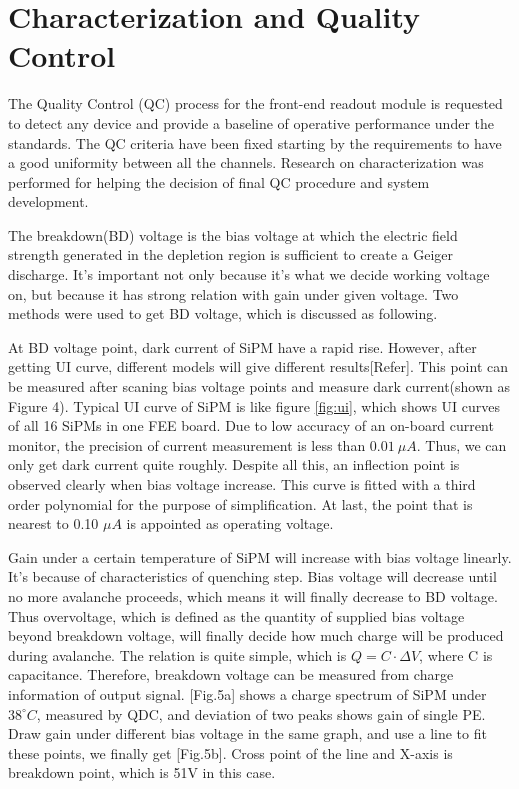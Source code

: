 \documentclass[11pt,a4paper]{article}
\begin{document}
\section{Characterization and Quality Control}
The Quality Control (QC) process for the front-end readout module is requested to detect any device and provide a baseline of operative performance under the standards. The QC criteria have been fixed starting by the requirements to have a good uniformity between all the channels. Research on characterization was performed for helping the decision of final QC procedure and system development.

The breakdown(BD) voltage is the bias voltage at which the electric field strength generated in the depletion region is sufficient to create a Geiger discharge. It's important not only because it's what we decide working voltage on, but because it has strong relation with gain under given voltage. Two methods were used to get BD voltage, which is discussed as following.

At BD voltage point, dark current of SiPM have a rapid rise. However, after getting UI curve, different models will give different results[Refer]. This point can be measured after scaning bias voltage points and measure dark current(shown as Figure 4).
Typical UI curve of SiPM is like figure \ref{fig:ui}, which shows UI curves of all 16 SiPMs in one FEE board.
Due to low accuracy of an on-board current monitor, the precision of current measurement is less than $0.01~\mu A$.
Thus, we can only get dark current quite roughly. Despite all this, an inflection point is observed clearly when bias voltage increase.
This curve is fitted with a third order polynomial for the purpose of simplification.
At last, the point that is nearest to 0.10 $\mu A$ is appointed as operating voltage.

Gain under a certain temperature of SiPM will increase with bias voltage linearly. It's because of characteristics of quenching step. Bias voltage will decrease until no more avalanche proceeds, which means it will finally decrease to BD voltage. Thus overvoltage, which is defined as the quantity of supplied bias voltage beyond breakdown voltage, will finally decide how much
charge will be produced during avalanche. The relation is quite simple, which is $Q=C\cdot\Delta V$, where C is capacitance. Therefore, breakdown voltage can be measured from charge information of output signal.
[Fig.5a] shows a charge spectrum of SiPM under $38^{\circ}C$, measured by QDC, and deviation of two peaks shows gain of single PE. Draw gain under different bias voltage in the same graph, and use a line to fit these points, we finally get [Fig.5b]. Cross point of the line and X-axis is breakdown point, which is 51V in this case.
\end{document}
